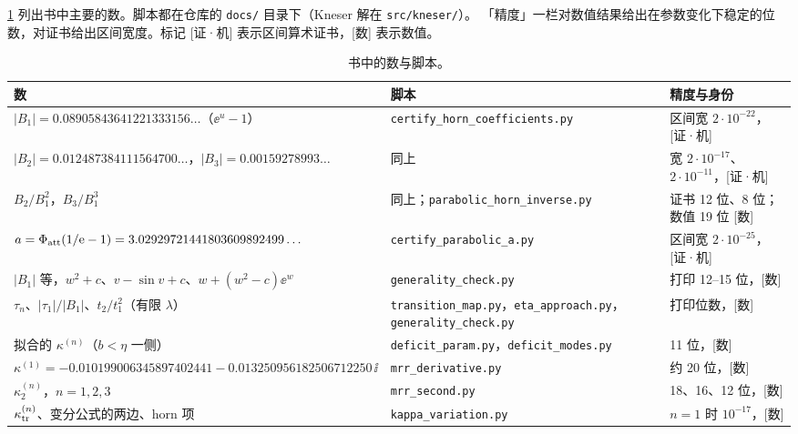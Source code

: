\cref{ch11:tab:numbers} 列出书中主要的数。脚本都在仓库的 \texttt{docs/} 目录下（Kneser 解在 \texttt{src/kneser/}）。
「精度」一栏对数值结果给出在参数变化下稳定的位数，对证书给出区间宽度。标记 [证·机] 表示区间算术证书，[数] 表示数值。

\begin{table}[htbp]
\centering\footnotesize
\caption{书中的数与脚本。}
\label{ch11:tab:numbers}
\begin{tabular}{p{}p{}p{}}
\toprule
数 & 脚本 & 精度与身份\\
\midrule
\raggedright $|B_1|=0.08905843641221333156\ldots$（$\ee^u-1$） & \raggedright \texttt{certify\_\allowbreak{}horn\_\allowbreak{}coefficients.py} & 区间宽 $2\cdot10^{-22}$，[证·机]\\
\raggedright $|B_2|=0.012487384111564700\ldots$，$|B_3|=0.00159278993\ldots$ & \raggedright 同上 & 宽 $2\cdot10^{-17}$、$2\cdot10^{-11}$，[证·机]\\
\raggedright $B_2/B_1^2$，$B_3/B_1^3$ & \raggedright 同上；\texttt{parabolic\_\allowbreak{}horn\_\allowbreak{}inverse.py} & 证书 12 位、8 位；数值 19 位 [数]\\
\raggedright $a=\Phi_{\mathrm{att}}(1/\mathrm{e}-1)=3.02929721441803609892499\ldots$ & \raggedright \texttt{certify\_\allowbreak{}parabolic\_\allowbreak{}a.py} & 区间宽 $2\cdot10^{-25}$，[证·机]\\
\raggedright $|B_1|$ 等，$w^2+c$、$v-\sin v+c$、$w+(w^2-c)\ee^w$ & \raggedright \texttt{generality\_\allowbreak{}check.py} & 打印 12--15 位，[数]\\
\raggedright $\tau_n$、$|\tau_1|/|B_1|$、$t_2/t_1^2$（有限 $\lambda$） & \raggedright \texttt{transition\_\allowbreak{}map.py}，\texttt{eta\_\allowbreak{}approach.py}，\texttt{generality\_\allowbreak{}check.py} & 打印位数，[数]\\
\raggedright 拟合的 $\kappa^{(n)}$（$b<\eta$ 一侧） & \raggedright \texttt{deficit\_\allowbreak{}param.py}，\texttt{deficit\_\allowbreak{}modes.py} & 11 位，[数]\\
\raggedright $\kappa^{(1)}=-0.010199006345897402441-0.013250956182506712250\,\ii$ & \raggedright \texttt{mrr\_\allowbreak{}derivative.py} & 约 20 位，[数]\\
\raggedright $\kappa^{(n)}_2$，$n=1,2,3$ & \raggedright \texttt{mrr\_\allowbreak{}second.py} & 18、16、12 位，[数]\\
\raggedright $\kappa_{\mathrm{tr}}^{(n)}$、变分公式的两边、horn 项 & \raggedright \texttt{kappa\_\allowbreak{}variation.py} & $n=1$ 时 $10^{-17}$，[数]\\

\end{tabular}
\end{table}
